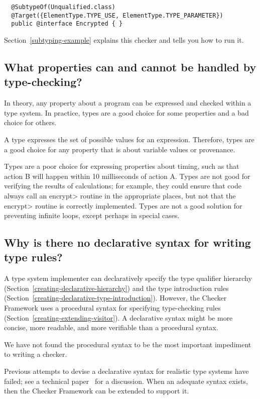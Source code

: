 \begin{Verbatim}
  @SubtypeOf(Unqualified.class)
  @Target({ElementType.TYPE_USE, ElementType.TYPE_PARAMETER})
  public @interface Encrypted { }
\end{Verbatim}

Section~\ref{subtyping-example} explains this checker and tells
you how to run it.


\subsection{What properties can and cannot be handled by type-checking?\label{faq-type-properties}}

In theory, any property about a program can be expressed and checked within
a type system.  In practice, types are a good choice for some properties
and a bad choice for others.

A type expresses the set of possible values for an expression.  Therefore,
types are a good choice for any property that is about variable values or
provenance.

Types are a poor choice for expressing properties about timing, such as
that action B will happen within 10 milliseconds of action A.  Types are
not good for verifying the results of calculations; for example, they could
ensure that code always call an \<encrypt> routine in the appropriate
places, but not that the \<encrypt> routine is correctly implemented.
Types are not a good solution for preventing infinite loops, except perhaps
in special cases.


\subsection{Why is there no declarative syntax for writing type rules?\label{faq-declarative-syntax-for-type-rules}}

A type system implementer can declaratively specify the type qualifier
hierarchy (Section~\ref{creating-declarative-hierarchy}) and the type introduction rules
(Section~\ref{creating-declarative-type-introduction}).  However, the Checker
Framework uses a procedural syntax for specifying type-checking
rules (Section~\ref{creating-extending-visitor}).
A declarative syntax might be more concise, more readable, and more
verifiable than a procedural syntax.

We have not found the procedural syntax to be the most important impediment
to writing a checker.

Previous attempts to devise a declarative syntax
for realistic type systems have failed; see a technical
paper~\cite{PapiACPE2008} for a discussion.  When an
adequate syntax exists, then the Checker Framework can be extended to
support it.


